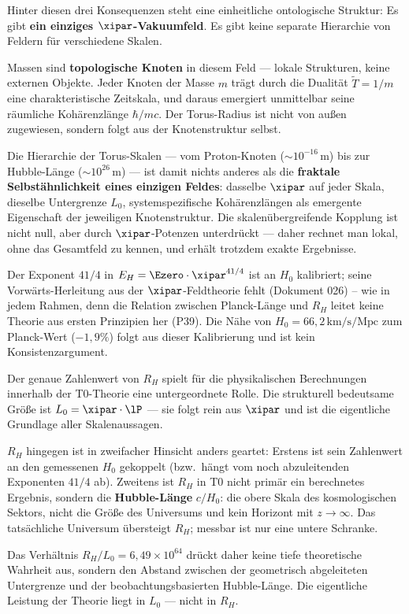 \begin{keypoint}
Hinter diesen drei Konsequenzen steht eine einheitliche ontologische Struktur: Es gibt \textbf{ein einziges $\xipar$-Vakuumfeld}. Es gibt keine separate Hierarchie von Feldern für verschiedene Skalen.

Massen sind \textbf{topologische Knoten} in diesem Feld — lokale Strukturen, keine externen Objekte. Jeder Knoten der Masse $m$ trägt durch die Dualität $\tilde{T} = 1/m$ eine charakteristische Zeitskala, und daraus emergiert unmittelbar seine räumliche Kohärenzlänge $\hbar/mc$. Der Torus-Radius ist nicht von außen zugewiesen, sondern folgt aus der Knotenstruktur selbst.

Die Hierarchie der Torus-Skalen — vom Proton-Knoten ($\sim 10^{-16}$\,m) bis zur Hubble-Länge ($\sim 10^{26}$\,m) — ist damit nichts anderes als die \textbf{fraktale Selbstähnlichkeit eines einzigen Feldes}: dasselbe $\xipar$ auf jeder Skala, dieselbe Untergrenze $L_0$, systemspezifische Kohärenzlängen als emergente Eigenschaft der jeweiligen Knotenstruktur. Die skalenübergreifende Kopplung ist nicht null, aber durch $\xipar$-Potenzen unterdrückt — daher rechnet man lokal, ohne das Gesamtfeld zu kennen, und erhält trotzdem exakte Ergebnisse.
\end{keypoint}

Der Exponent $41/4$ in $E_H = \Ezero \cdot \xipar^{41/4}$ ist an $H_0$ kalibriert; seine Vorwärts-Herleitung aus der $\xipar$-Feldtheorie fehlt (Dokument 026) -- wie in jedem Rahmen, denn die Relation zwischen Planck-Länge und $R_H$ leitet keine Theorie aus ersten Prinzipien her (P39). Die Nähe von $H_0 = 66{,}2\,\text{km/s/Mpc}$ zum Planck-Wert ($-1{,}9\%$) folgt aus dieser Kalibrierung und ist kein Konsistenzargument.

\begin{foundation}
Der genaue Zahlenwert von $R_H$ spielt für die physikalischen Berechnungen innerhalb der T0-Theorie eine untergeordnete Rolle. Die strukturell bedeutsame Größe ist $L_0 = \xipar \cdot \lP$ — sie folgt rein aus $\xipar$ und ist die eigentliche Grundlage aller Skalenaussagen.

$R_H$ hingegen ist in zweifacher Hinsicht anders geartet: Erstens ist sein Zahlenwert an den gemessenen $H_0$ gekoppelt (bzw.\ hängt vom noch abzuleitenden Exponenten $41/4$ ab). Zweitens ist $R_H$ in T0 nicht primär ein berechnetes Ergebnis, sondern die \textbf{Hubble-Länge} $c/H_0$: die obere Skala des kosmologischen Sektors, nicht die Größe des Universums und kein Horizont mit $z \to \infty$. Das tatsächliche Universum übersteigt $R_H$; messbar ist nur eine untere Schranke.

Das Verhältnis $R_H/L_0 = 6{,}49 \times 10^{64}$ drückt daher keine tiefe theoretische Wahrheit aus, sondern den Abstand zwischen der geometrisch abgeleiteten Untergrenze und der beobachtungsbasierten Hubble-Länge. Die eigentliche Leistung der Theorie liegt in $L_0$ — nicht in $R_H$.
\end{foundation}

